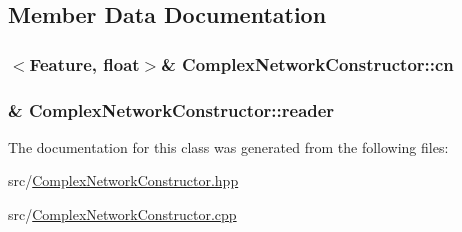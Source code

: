 \subsection{Member Data Documentation}
\hypertarget{class_complex_network_constructor_a1a57adca10cfd3e434c186bd4259873f}{
\subsubsection[{cn}]{$<${\bf Feature}, float$>$\& Complex\+Network\+Constructor\+::cn\hspace{0.3cm}{\ttfamily [private]}}}\label{class_complex_network_constructor_a1a57adca10cfd3e434c186bd4259873f}
\hypertarget{class_complex_network_constructor_ad223ad7e464ff159d91a89deb4e943cc}{
\subsubsection[{reader}]{\& Complex\+Network\+Constructor\+::reader\hspace{0.3cm}{\ttfamily [private]}}}\label{class_complex_network_constructor_ad223ad7e464ff159d91a89deb4e943cc}


The documentation for this class was generated from the following files\+:\begin{DoxyCompactItemize}
\item 
src/\hyperlink{_complex_network_constructor_8hpp}{Complex\+Network\+Constructor.\+hpp}\item 
src/\hyperlink{_complex_network_constructor_8cpp}{Complex\+Network\+Constructor.\+cpp}\end{DoxyCompactItemize}
